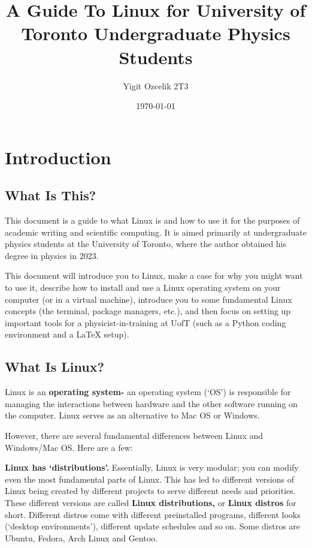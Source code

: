\documentclass[12pt]{article}
\title{A Guide To Linux for University of Toronto Undergraduate Physics Students}
\author{Yigit Ozcelik 2T3}
\date{\today}
\begin{document}
\maketitle

\pagebreak
\tableofcontents

\pagebreak
\section*{Introduction}

\subsection*{What Is This?}

This document is a guide to what Linux is and how to use it for the purposes of academic writing and scientific computing. It is aimed primarily at undergraduate physics students at the University of Toronto, where the author obtained his degree in physics in 2023. 

This document will introduce you to Linux, make a case for why you might want to use it, describe how to install and use a Linux operating system on your computer (or in a virtual machine), introduce you to some fundamental Linux concepts (the terminal, package managers, etc.), and then focus on setting up important tools for a physicist-in-training at UofT (such as a Python coding environment and a LaTeX setup). 

\subsection*{What Is Linux?}

Linux is an \textbf{operating system-} an operating system (`OS') is responsible for managing the interactions between hardware and the other software running on the computer. Linux serves as an alternative to Mac OS or Windows. 

However, there are several fundamental differences between Linux and Windows/Mac OS. Here are a few:

\textbf{Linux has `distributions'.} Essentially, Linux is very modular; you can modify even the most fundamental parts of Linux. This has led to different versions of Linux being created by different projects to serve different needs and priorities. These different versions are called \textbf{Linux distributions,} or \textbf{Linux distros} for short. Different distros come with different preinstalled programs, different looks (`desktop environments'), different update schedules and so on. Some distros are Ubuntu, Fedora, Arch Linux and Gentoo.
\end{document}
